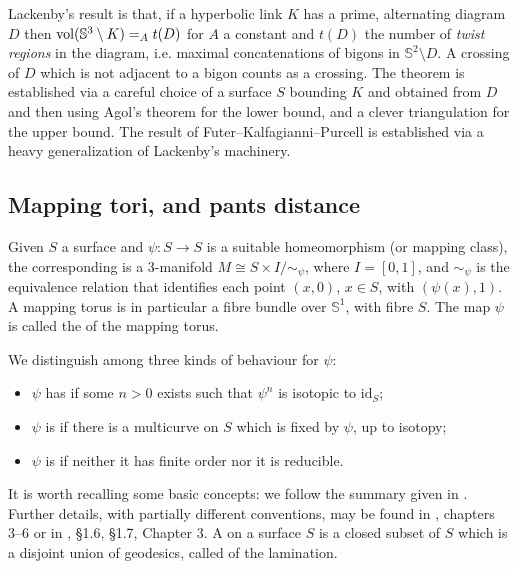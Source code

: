 Lackenby's result is that, if a hyperbolic link $K$ has a prime, alternating diagram $D$ then $\mathrm{vol}(\mathbb S^3\setminus K)=_A t(D)$ for $A$ a constant and $t(D)$ the number of \emph{twist regions} in the diagram, i.e. maximal concatenations of bigons in $\mathbb S^2\setminus D$. A crossing of $D$ which is not adjacent to a bigon counts as a crossing. The theorem is established via a careful choice of a surface $S$ bounding $K$ and obtained from $D$ and then using Agol's theorem for the lower bound, and a clever triangulation for the upper bound. The result of Futer--Kalfagianni--Purcell is established via a heavy generalization of Lackenby's machinery.

\subsection{Mapping tori, and pants distance}\label{sub:mappingtori}

Given $S$ a surface and $\psi:S\rightarrow S$ is a suitable homeomorphism (or mapping class), the corresponding  is a 3-manifold $M \cong S\times I/\sim_\psi$, where $I=[0,1]$, and $\sim_\psi$ is the equivalence relation that identifies each point $(x,0)$, $x\in S$, with $(\psi(x),1)$. A mapping torus is in particular a fibre bundle over $\mathbb S^1$, with fibre $S$. The map $\psi$ is called the  of the mapping torus.

We distinguish among three kinds of behaviour for $\psi$:
\begin{itemize}
\item $\psi$ has  if some $n>0$ exists such that $\psi^n$ is isotopic to $\mathrm{id}_S$;
\item $\psi$ is  if there is a multicurve on $S$ which is fixed by $\psi$, up to isotopy;
\item $\psi$ is  if neither it has finite order nor it is reducible.
\end{itemize}

It is worth recalling some basic concepts: we follow the summary given in \cite{hyperbfibermfld}. Further details, with partially different conventions, may be found in \cite{cassonbleiler}, chapters 3--6 or in \cite{penner}, \S 1.6, \S 1.7, Chapter 3. A  on a surface $S$ is a closed subset of $S$ which is a disjoint union of geodesics, called  of the lamination.

